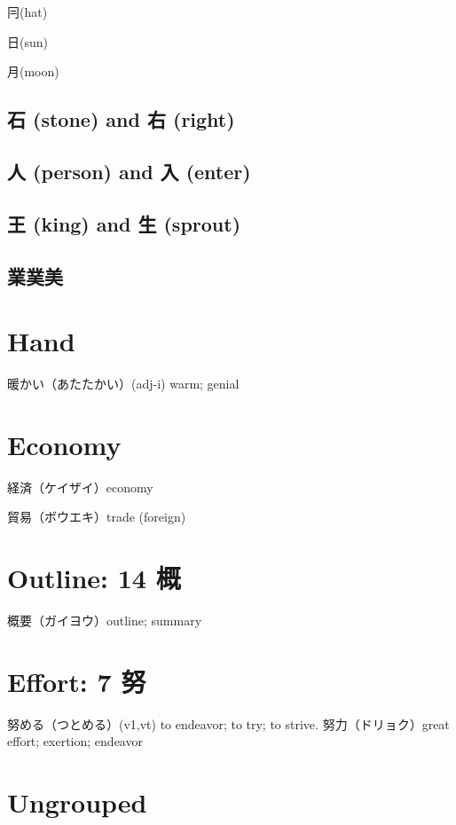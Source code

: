 冃(hat)

日(sun)

月(moon)

\subsection{石 (stone) and 右 (right)}

\subsection{人 (person) and 入 (enter)}

\subsection{王 (king) and 生 (sprout)}

\subsection{業菐美}

\section{Hand}

暖かい（あたたかい）(adj-i) warm; genial

\section{Economy}

経済（ケイザイ）economy

貿易（ボウエキ）trade (foreign)

\section{Outline: 14 概}

概要（ガイヨウ）outline; summary

\section{Effort: 7 努}

努める（つとめる）(v1,vt) to endeavor; to try; to strive.
努力（ドリョク）great effort; exertion; endeavor

\section{Ungrouped}


